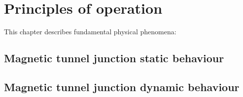 \chapter{Principles of operation}
\label{sec:Principles}

This chapter describes fundamental physical phenomena:

\lipsum

\section{Magnetic tunnel junction static behaviour} \label{sec:PrinciplesMTJStatic}
\lipsum

\section{Magnetic tunnel junction dynamic behaviour} \label{sec:PrinciplesMTJDynamic}
\lipsum